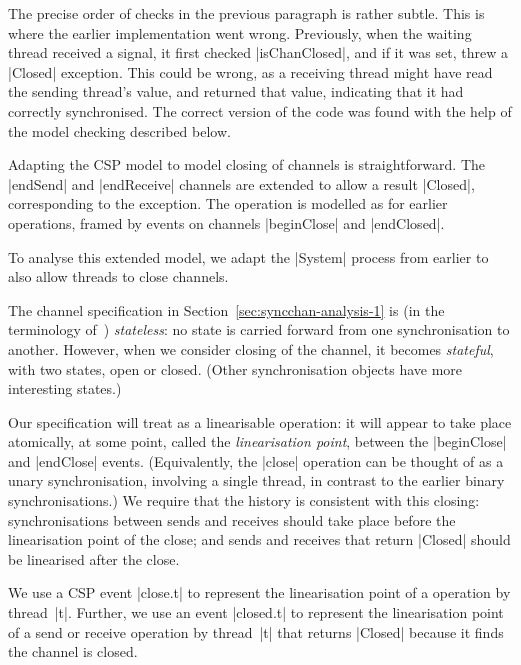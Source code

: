 The precise order of checks in the previous paragraph is rather subtle.  This
is where the earlier implementation went wrong.  Previously, when the waiting
thread received a signal, it first checked |isChanClosed|, and if it was set,
threw a |Closed| exception.  This could be wrong, as a receiving thread might
have read the sending thread's value, and returned that value, indicating that
it had correctly synchronised.  The correct version of the code was found with
the help of the model checking described below. 


\inlineCSP

Adapting the CSP model to model closing of channels is straightforward.  The
|endSend| and |endReceive| channels are extended to allow a result |Closed|,
corresponding to the  exception.  The  operation is
modelled as for earlier operations, framed by events on channels |beginClose|
and |endClosed|.


To analyse this extended model, we adapt the |System| process from earlier to
also allow threads to close channels.  

The channel specification in Section~\ref{sec:syncchan-analysis-1} is (in the
terminology of~\cite{LL:synchronisation}) \emph{stateless}: no state is
carried forward from one synchronisation to another.  However, when we
consider closing of the channel, it becomes \emph{stateful}, with two states,
open or closed.  (Other synchronisation objects have more interesting states.)

Our specification will treat  as a linearisable operation: it
will appear to take place atomically, at some point, called the
\emph{linearisation point}, between the |beginClose| and |endClose| events.
(Equivalently, the |close| operation can be thought of as a unary
synchronisation, involving a single thread, in contrast to the earlier binary
synchronisations.)  We require that the history is consistent with this
closing: synchronisations between sends and receives should take place before
the linearisation point of the close; and sends and receives that return
|Closed| should be linearised after the close.

We use a CSP event |close.t| to represent the linearisation point of a
 operation by thread~|t|.  Further, we use an event |closed.t| to
represent the linearisation point of a send or receive operation by thread~|t|
that returns |Closed| because it finds the channel is closed.

